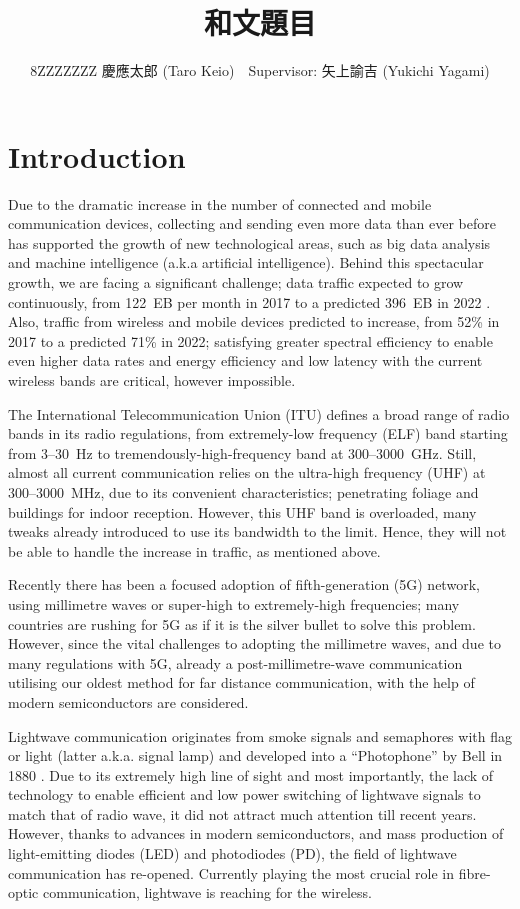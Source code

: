 ﻿\documentclass[twocolumn,9pt]{ltjsarticle}
\title{和文題目}
\author{8ZZZZZZZ 慶應太郎 (Taro Keio)　Supervisor: 矢上諭吉 (Yukichi Yagami)}
\begin{document}
\maketitle
\section{Introduction}
Due to the dramatic increase in the number of connected and mobile communication devices, collecting and sending even more data than ever before has supported the growth of new technological areas, such as big data analysis and machine intelligence (a.k.a artificial intelligence).
Behind this spectacular growth, we are facing a significant challenge; data traffic expected to grow continuously, from \SI{122}{EB} per month in 2017 to a predicted \SI{396}{EB} in 2022 \cite{cisco}.
Also, traffic from wireless and mobile devices predicted to increase, from 52\% in 2017 to a predicted 71\% in 2022; satisfying greater spectral efficiency to enable even higher data rates and energy efficiency and low latency with the current wireless bands are critical, however impossible.

The International Telecommunication Union (ITU) defines a broad range of radio bands in its radio regulations,
from extremely-low frequency (ELF) band starting from 3--\SI{30}{Hz} to tremendously-high-frequency band at 300--\SI{3000}{GHz}.
Still, almost all current communication relies on the ultra-high frequency (UHF) at 300--\SI{3000}{MHz}, due to its convenient characteristics; penetrating foliage and buildings for indoor reception.
However, this UHF band is overloaded, many tweaks already introduced to use its bandwidth to the limit. 
Hence, they will not be able to handle the increase in traffic, as mentioned above.

Recently there has been a focused adoption of fifth-generation (5G) network, using millimetre waves or super-high to extremely-high frequencies; many countries are rushing for 5G as if it is the silver bullet to solve this problem.
However, since the vital challenges to adopting the millimetre waves, and due to many regulations with 5G, already a post-millimetre-wave communication utilising our oldest method for far distance communication, with the help of modern semiconductors are considered.

Lightwave communication originates from smoke signals and semaphores with flag or light (latter a.k.a. signal lamp) and developed into a ``Photophone'' by Bell in 1880 \cite{bell}.
Due to its extremely high line of sight and most importantly, the lack of technology to enable efficient and low power switching of lightwave signals to match that of radio wave, it did not attract much attention till recent years.
However, thanks to advances in modern semiconductors, and mass production of light-emitting diodes (LED) and photodiodes (PD), the field of lightwave communication has re-opened.
Currently playing the most crucial role in fibre-optic communication, lightwave is reaching for the wireless.
\end{document}
